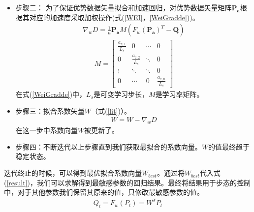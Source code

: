 \begin{itemize}
	\item 步骤二： 为了保证优势数据矢量拟合和加速回归，对优势数据矢量矩阵$\bm{P_{a}}$根据其对应的加速度采取加权操作(式(\ref{WEI}，\ref{WeiGradde}))。
	\begin{eqnarray}\label{WEI}
	\nabla_{w}D=\frac{1}{n}\bm{P_{a}}M(F_{w}(\bm{P_{a}})^{T}-\bm{Q})
	\end{eqnarray}
	\begin{eqnarray}\label{WeiGradde}
	M=\begin{bmatrix}
	\frac{a_{z,1}}{L_{s}}&0&\cdots&0\\
	0&\frac{a_{z,2}}{L_{s}}&\ddots&0\\
	\vdots&\ddots&\ddots&0\\
	0&\cdots&0&\frac{a_{z,n}}{L_{s}}
	\end{bmatrix}
	\end{eqnarray}
	在式(\ref{WeiGradde})中，$L_s$是可变学习步长，$M$是学习率矩阵。
	
	\item 步骤三：拟合系数矢量$W$（式(\ref{fit})）。
	\begin{eqnarray}\label{fit}
	W=W-\nabla_{w}D
	\end{eqnarray}
	在这一步中系数向量$W$被更新了。
	
	\item 步骤四：不断迭代以上步骤直到我们获取最拟合的系数向量。$W$的值最终趋于稳定状态。
\end{itemize}

迭代终止的时候，可以得到最优拟合系数向量$W_{best}$。通过将$W_{best}$代入式(\ref{result})，我们可以求解得到最敏感参数的回归结果。最终将结果用于步态的控制中，对于其他参数我们保留其原来的值，只修改最敏感参数的值。
\begin{eqnarray}\label{result}
Q_{t} = F_{w}(P_{t})=W^{T}P_{t}
\end{eqnarray}